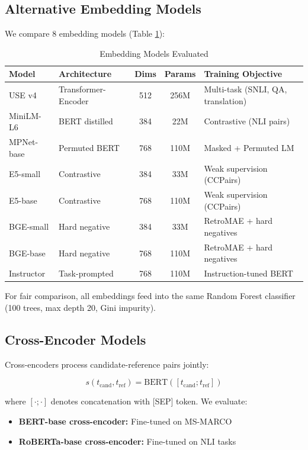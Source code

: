 \documentclass[11pt]{article}
\begin{document}
\subsection{Alternative Embedding Models}

We compare 8 embedding models (Table \ref{tab:embeddings}):

\begin{table}[h]
\centering
\small
\caption{Embedding Models Evaluated}
\label{tab:embeddings}
\begin{tabular}{llccl}
\toprule
\textbf{Model} & \textbf{Architecture} & \textbf{Dims} & \textbf{Params} & \textbf{Training Objective} \\
\midrule
USE v4 & Transformer-Encoder & 512 & 256M & Multi-task (SNLI, QA, translation) \\
MiniLM-L6 & BERT distilled & 384 & 22M & Contrastive (NLI pairs) \\
MPNet-base & Permuted BERT & 768 & 110M & Masked + Permuted LM \\
E5-small & Contrastive & 384 & 33M & Weak supervision (CCPairs) \\
E5-base & Contrastive & 768 & 110M & Weak supervision (CCPairs) \\
BGE-small & Hard negative & 384 & 33M & RetroMAE + hard negatives \\
BGE-base & Hard negative & 768 & 110M & RetroMAE + hard negatives \\
Instructor & Task-prompted & 768 & 110M & Instruction-tuned BERT \\
\bottomrule
\end{tabular}
\end{table}

For fair comparison, all embeddings feed into the same Random Forest classifier (100 trees, max depth 20, Gini impurity).

\subsection{Cross-Encoder Models}

Cross-encoders process candidate-reference pairs jointly:

\begin{equation}
s(t_{\text{cand}}, t_{\text{ref}}) = \text{BERT}([t_{\text{cand}}; t_{\text{ref}}])
\end{equation}

where $[\cdot;\cdot]$ denotes concatenation with [SEP] token. We evaluate:

\begin{itemize}
    \item \textbf{BERT-base cross-encoder:} Fine-tuned on MS-MARCO \cite{Nguyen2016MSMARCO}
    \item \textbf{RoBERTa-base cross-encoder:} Fine-tuned on NLI tasks
\end{itemize}
\end{document}
